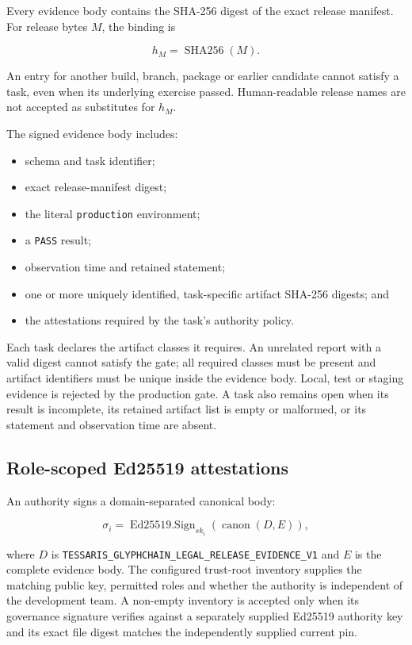 Every evidence body contains the SHA-256 digest of the exact release manifest.
For release bytes $M$, the binding is

\begin{equation}
  h_M = \operatorname{SHA256}(M).
\end{equation}

An entry for another build, branch, package or earlier candidate cannot satisfy
a task, even when its underlying exercise passed.  Human-readable release names
are not accepted as substitutes for $h_M$.

The signed evidence body includes:

\begin{itemize}
  \item schema and task identifier;
  \item exact release-manifest digest;
  \item the literal \texttt{production} environment;
  \item a \texttt{PASS} result;
  \item observation time and retained statement;
  \item one or more uniquely identified, task-specific artifact SHA-256 digests;
        and
  \item the attestations required by the task's authority policy.
\end{itemize}

Each task declares the artifact classes it requires.  An unrelated report with a
valid digest cannot satisfy the gate; all required classes must be present and
artifact identifiers must be unique inside the evidence body.  Local, test or
staging evidence is rejected by the production gate.  A task
also remains open when its result is incomplete, its retained artifact list is
empty or malformed, or its statement and observation time are absent.

\subsection{Role-scoped Ed25519 attestations}

An authority signs a domain-separated canonical body:

\begin{equation}
  \sigma_i = \operatorname{Ed25519.Sign}_{sk_i}\!\left(
    \operatorname{canon}(D,E)
  \right),
\end{equation}

where $D$ is
\texttt{TESSARIS\_GLYPHCHAIN\_LEGAL\_RELEASE\_EVIDENCE\_V1} and $E$ is the
complete evidence body.  The configured trust-root inventory supplies the
matching public key, permitted roles and whether the authority is independent
of the development team.  A non-empty inventory is accepted only when its
governance signature verifies against a separately supplied Ed25519 authority
key and its exact file digest matches the independently supplied current pin.

